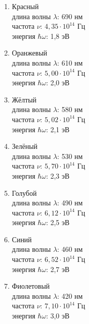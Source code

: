 \documentclass[14pt,a4paper]{article}
\begin{document}
    \par 
        \begin{enumerate}
            \item Красный\\
            длина волны {$\lambda$}: 690 нм\\
            частота {$\nu$}: {$4,35 \cdot 10^{14}$} Гц\\
            энергия {$\hbar \omega$}: 1,8 эВ
            \item Оранжевый\\
            длина волны {$\lambda$}: 610 нм\\
            частота {$\nu$}: {$5,00 \cdot 10^{14}$} Гц\\
            энергия {$\hbar \omega$}: 2,0 эВ
            \item Жёлтый\\
            длина волны {$\lambda$}: 580 нм\\
            частота {$\nu$}: {$5,02 \cdot 10^{14}$} Гц\\
            энергия {$\hbar \omega$}: 2,1 эВ
            \item Зелёный\\
            длина волны {$\lambda$}: 530 нм\\
            частота {$\nu$}: {$5,70 \cdot 10^{14}$} Гц\\
            энергия {$\hbar \omega$}: 2,3 эВ
            \item Голубой\\
            длина волны {$\lambda$}: 490 нм\\
            частота {$\nu$}: {$6,12 \cdot 10^{14}$} Гц\\
            энергия {$\hbar \omega$}: 2,5 эВ
            \item Синий\\
            длина волны {$\lambda$}: 460 нм\\
            частота {$\nu$}: {$6,52 \cdot 10^{14}$} Гц\\
            энергия {$\hbar \omega$}: 2,7 эВ
            \item Фиолетовый\\
            длина волны {$\lambda$}: 420 нм\\
            частота {$\nu$}: {$7,10 \cdot 10^{14}$} Гц\\
            энергия {$\hbar \omega$}: 3,0 эВ
        \end{enumerate}

\vspace{0.8cm}
\end{document}
